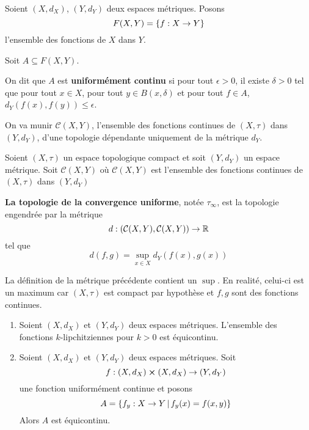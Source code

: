 \begin{definition}
	Soient $(X, d_{X})$, $(Y, d_{Y})$ deux espaces métriques.
	Posons
	\begin{equation}
		F(X, Y) = \left\{ f : X \rightarrow Y \right\}
	\end{equation}
	l'ensemble des fonctions de $X$ dans $Y$.

	Soit $A \subseteq F(X, Y)$.

	On dit que $A$ est \textbf{uniformément continu} si pour tout $\epsilon >
	0$, il existe $\delta > 0$ tel que pour tout $x \in X$, pour tout $y \in
	B(x, \delta)$ et pour tout $f \in A$, $d_{Y}(f(x), f(y)) \leq \epsilon$.
\end{definition}

On va munir $\mathcal{C}(X, Y)$, l'ensemble des fonctions continues de $(X,
\tau)$ dans $(Y, d_{Y})$, d'une topologie dépendante uniquement de
la métrique $d_{Y}$.

\begin{definition} 
	Soient $(X, \tau)$ un espace topologique compact et soit $(Y, d_{Y})$ un
	espace métrique.
	Soit $\mathcal{C}(X, Y)$ où $\mathcal{C}(X, Y)$ est
	l'ensemble des fonctions continues de $(X, \tau)$ dans $(Y, d_{Y})$

	\textbf{La topologie de la convergence uniforme}, notée $\tau_{\infty}$, est
	la topologie engendrée par la métrique
	\begin{equation}
		d : (\mathcal{C}(X, Y), \mathcal{C}(X, Y)) \rightarrow \mathbb{R}
	\end{equation}
	tel que
	\begin{equation}
		d(f, g) = \sup_{x \in X} d_{Y}(f(x), g(x))
	\end{equation}
\end{definition}

\begin{remarque}
	La définition de la métrique précédente contient un $\sup$. En realité,
	celui-ci est un maximum car $(X, \tau)$ est compact par hypothèse et $f, g$
	sont des fonctions continues.
\end{remarque}

\begin{exemple}
	\begin{enumerate}
		\item Soient $(X, d_{X})$ et $(Y, d_{Y})$ deux espaces métriques.
			L'ensemble des fonctions $k$-lipchitziennes pour $k > 0$ est
			équicontinu.
		\item Soient $(X, d_{X})$ et $(Y, d_{Y})$ deux espaces métriques. Soit
			\begin{equation}
				f : (X, d_{X}) \cross (X, d_{X}) \rightarrow (Y, d_{Y})
			\end{equation}
			une fonction uniformément continue et posons
			\begin{equation}
				A = \left\{f_{y} : X \rightarrow Y \, | \, f_{y}(x) = f(x, y) \right\}
			\end{equation}
			Alors $A$ est équicontinu.
	\end{enumerate}
\end{exemple}


